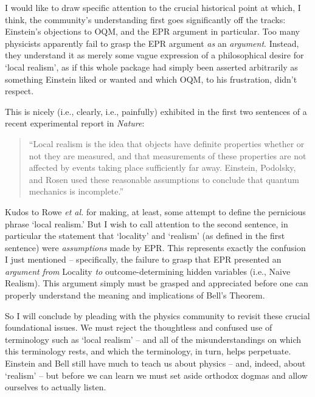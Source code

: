 \documentclass[12pt]{article}
\begin{document}
I would like to draw specific attention to the crucial historical
point at which, I think, the community's understanding first goes
significantly off the tracks:  Einstein's objections to OQM, and the
EPR argument in particular.  Too many physicists apparently fail to
grasp the EPR argument \emph{as} an \emph{argument}.  Instead, they
understand it as merely some vague expression of a philosophical
desire for `local realism', as if this whole package had simply been
asserted arbitrarily as something Einstein liked or wanted and which
OQM, to his frustration, didn't respect.  

This is nicely (i.e., clearly, i.e., painfully) exhibited in the first
two sentences of a recent experimental report in \emph{Nature}:
\begin{quote}
``Local realism is the idea that objects have definite properties
whether or not they are measured, and that measurements of these
properties are not affected by events taking place sufficiently far
away.  Einstein, Podolsky, and Rosen used these reasonable assumptions
to conclude that quantum mechanics is incomplete.'' \cite{rowe}
\end{quote}
Kudos to Rowe \emph{et al.} for making, at least, some attempt to define the
pernicious phrase `local realism.'  But I wish to call attention to
the second sentence, in particular the statement that `locality' and
`realism' (as defined in the first sentence) were \emph{assumptions}
made by EPR.  This represents exactly the confusion I just
mentioned -- specifically, the failure to grasp that EPR presented an
\emph{argument} \emph{from} Locality \emph{to} outcome-determining
hidden variables (i.e., Naive Realism). \cite{boxes}  This argument
simply must be grasped and appreciated before one can properly
understand the meaning and implications of Bell's Theorem.

So I will conclude by pleading with the physics community to revisit
these crucial foundational issues.  We must reject the thoughtless and
confused use of terminology such as `local realism' -- and
all of the misunderstandings on which this terminology rests, and
which the terminology, in turn, helps perpetuate.  Einstein and Bell
still have much to teach us about physics -- and, indeed, about
`realism' -- but before we can learn we must set aside orthodox
dogmas and allow ourselves to actually listen.
\end{document}
